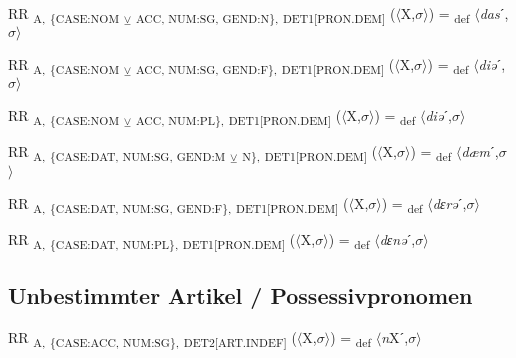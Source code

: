 {\begin{exe}
 RR \textsubscript{A,} \textsubscript{\{CASE:NOM} \textsubscript{${\veebar}$}\textsubscript{ ACC, NUM:SG, GEND:N\},} \textsubscript{DET1[PRON.DEM]} ($\langle$X,$\sigma $$\rangle$) = \textsubscript{def} $\langle$\textit{das}ˊ,$\sigma $$\rangle$
\end{exe}

\begin{exe}
 RR \textsubscript{A,} \textsubscript{\{CASE:NOM} \textsubscript{${\veebar}$}\textsubscript{ ACC, NUM:SG, GEND:F\},} \textsubscript{DET1[PRON.DEM]} ($\langle$X,$\sigma $$\rangle$) = \textsubscript{def} $\langle$\textit{diə}ˊ,$\sigma $$\rangle$
\end{exe}

\begin{exe}
 RR \textsubscript{A,} \textsubscript{\{CASE:NOM} \textsubscript{${\veebar}$}\textsubscript{ ACC, NUM:PL\},} \textsubscript{DET1[PRON.DEM]} ($\langle$X,$\sigma $$\rangle$) = \textsubscript{def} $\langle$\textit{diə}ˊ,$\sigma $$\rangle$
\end{exe}

\begin{exe}
 RR \textsubscript{A,} \textsubscript{\{CASE:DAT, NUM:SG, GEND:M} \textsubscript{${\veebar}$}\textsubscript{ N\},} \textsubscript{DET1[PRON.DEM]} ($\langle$X,$\sigma $$\rangle$) = \textsubscript{def} $\langle$\textit{dæm}ˊ,$\sigma $$\rangle$
\end{exe}

\begin{exe}
 RR \textsubscript{A,} \textsubscript{\{CASE:DAT, NUM:SG, GEND:F\},} \textsubscript{DET1[PRON.DEM]} ($\langle$X,$\sigma $$\rangle$) = \textsubscript{def} $\langle$\textit{dɛrə}ˊ,$\sigma $$\rangle$
\end{exe}

\begin{exe}
 RR \textsubscript{A,} \textsubscript{\{CASE:DAT, NUM:PL\},} \textsubscript{DET1[PRON.DEM]} ($\langle$X,$\sigma $$\rangle$) = \textsubscript{def} $\langle$\textit{dɛnə}ˊ,$\sigma $$\rangle$
\end{exe}

\subsection{Unbestimmter Artikel / Possessivpronomen}

\begin{exe}
 RR \textsubscript{A,} \textsubscript{\{CASE:ACC, NUM:SG\},} \textsubscript{DET2[ART.INDEF]} ($\langle$X,$\sigma $$\rangle$) = \textsubscript{def} $\langle$\textit{n}Xˊ,$\sigma $$\rangle$
\end{exe}

}

